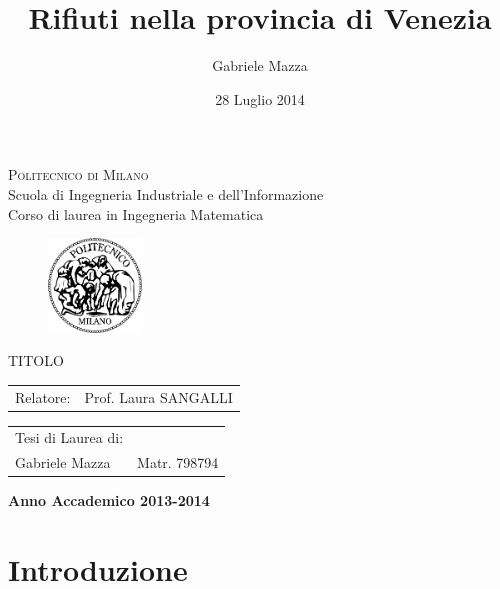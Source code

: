 \documentclass[a4paper,11pt,twoside,openright]{book}							%
\date{28 Luglio 2014}
\author{Gabriele Mazza}
\title{Rifiuti nella provincia di Venezia}
\begin{document}

\thispagestyle{empty}
\enlargethispage{60mm}
\begin{center}
\Large{\textsc{Politecnico di Milano}}\\
\large{Scuola di Ingegneria Industriale e dell'Informazione}\\
\large{Corso di laurea in Ingegneria Matematica}\\
\vspace{10mm}
\begin{figure}[h]
	\begin{center}
	\includegraphics[width=25mm]{Immagini/Logo.png}
	\end{center}
	\end{figure}
\vspace{5mm}

\begin{LARGE}
TITOLO
\end{LARGE}
\vspace{30mm}

\begin{flushleft}
\begin{tabular}{l l }
Relatore:    & Prof. Laura SANGALLI\\
\end{tabular}
\end{flushleft}
\vspace{30mm}

\begin{flushright}
\begin{tabular}{l l }
Tesi di Laurea di: & \\
Gabriele Mazza & Matr. 798794 \\
\end{tabular}
\end{flushright}
\vfill
{\large{\bf Anno Accademico 2013-2014}}
\end{center}

\tableofcontents

\chapter*{Introduzione}
\label{Cap:intro}
\end{document}
